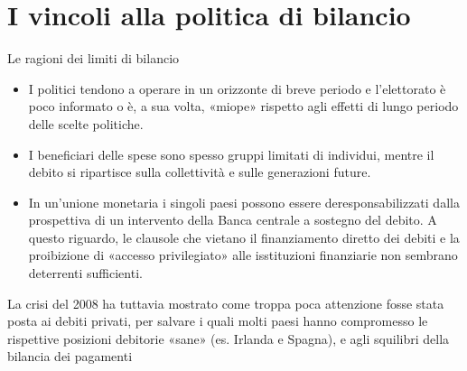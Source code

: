 \documentclass[aspectratio=64,11pt]{beamer}
\begin{document}
\section{I vincoli alla politica di bilancio}

\begin{frame}{Le ragioni dei limiti di bilancio}

  \begin{itemize}
  \item I politici tendono a operare in un orizzonte di breve periodo e
    l'elettorato è poco informato o è, a sua volta, «miope» rispetto agli
    effetti di lungo periodo delle scelte politiche.
  \item I beneficiari delle spese sono spesso gruppi limitati di individui,
    mentre il debito si ripartisce sulla collettività e sulle generazioni
    future.
  \item In un'unione monetaria i singoli paesi possono essere
    deresponsabilizzati dalla prospettiva di un intervento della Banca
    centrale a sostegno del debito. A questo riguardo, le clausole che vietano
    il finanziamento diretto dei debiti e la proibizione di «accesso
    privilegiato» alle isstituzioni finanziarie non sembrano deterrenti
    sufficienti.
  \end{itemize}
  
\begin{block}{}
  La crisi del 2008 ha tuttavia mostrato come troppa poca attenzione fosse
  stata posta ai \alert{debiti privati}, per salvare i quali molti paesi hanno
  compromesso le rispettive posizioni debitorie «sane» (es. Irlanda e Spagna),
  e agli \alert{squilibri della bilancia dei pagamenti}
\end{block}
\end{frame}
\end{document}
